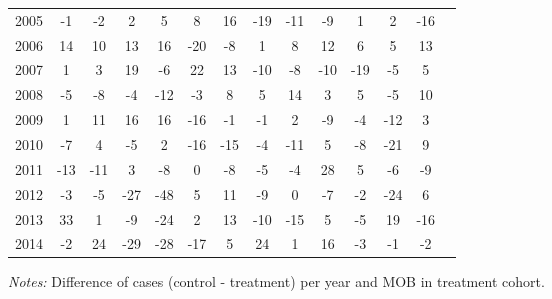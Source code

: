\begin{table}[H]
\begin{threeparttable}
{\begin{tabular}{l*{13}{c}}
2005        &          -1&          -2&           2&           5&           8&          16&         -19&         -11&          -9&           1&           2&         -16\\
2006        &          14&          10&          13&          16&         -20&          -8&           1&           8&          12&           6&           5&          13\\
2007        &           1&           3&          19&          -6&          22&          13&         -10&          -8&         -10&         -19&          -5&           5\\
2008        &          -5&          -8&          -4&         -12&          -3&           8&           5&          14&           3&           5&          -5&          10\\
2009        &           1&          11&          16&          16&         -16&          -1&          -1&           2&          -9&          -4&         -12&           3\\
2010        &          -7&           4&          -5&           2&         -16&         -15&          -4&         -11&           5&          -8&         -21&           9\\
2011        &         -13&         -11&           3&          -8&           0&          -8&          -5&          -4&          28&           5&          -6&          -9\\
2012        &          -3&          -5&         -27&         -48&           5&          11&          -9&           0&          -7&          -2&         -24&           6\\
2013        &          33&           1&          -9&         -24&           2&          13&         -10&         -15&           5&          -5&          19&         -16\\
2014        &          -2&          24&         -29&         -28&         -17&           5&          24&           1&          16&          -3&          -1&          -2\\
 \bottomrule \end{tabular} } \begin{tablenotes} \item \scriptsize \emph{Notes:} Difference of cases (control - treatment) per year and MOB in treatment cohort. \end{tablenotes} \end{threeparttable} \end{table} 
